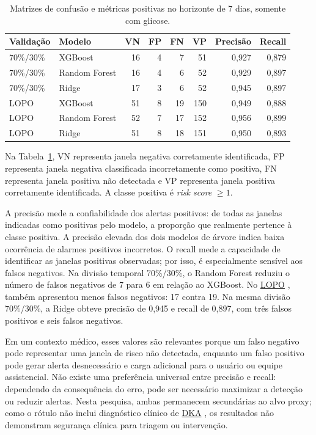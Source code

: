 \documentclass[12pt,a4paper]{article}
\DeclareRobustCommand{\sigla}[1]{%
    \texorpdfstring{\hyperlink{sigla:#1}{#1}}{#1}%
}
\begin{document}
\begin{table}[H]
    \centering
    \caption{Matrizes de confusão e métricas positivas no horizonte de 7 dias,
    somente com glicose.}
    \label{tab:matrizes-confusao}
    \small
    \begin{tabular}{llrrrrrr}
        \toprule
        Validação & Modelo & VN & FP & FN & VP & Precisão & Recall \\
        \midrule
        70\%/30\% & XGBoost & 16 & 4 & 7 & 51 & 0,927 & 0,879 \\
        70\%/30\% & Random Forest & 16 & 4 & 6 & 52 & 0,929 & 0,897 \\
        70\%/30\% & Ridge & 17 & 3 & 6 & 52 & 0,945 & 0,897 \\
        LOPO & XGBoost & 51 & 8 & 19 & 150 & 0,949 & 0,888 \\
        LOPO & Random Forest & 52 & 7 & 17 & 152 & 0,956 & 0,899 \\
        LOPO & Ridge & 51 & 8 & 18 & 151 & 0,950 & 0,893 \\
        \bottomrule
    \end{tabular}
\end{table}

Na Tabela~\ref{tab:matrizes-confusao}, VN representa janela negativa corretamente
identificada, FP representa janela negativa classificada incorretamente como
positiva, FN representa janela positiva não detectada e VP representa janela
positiva corretamente identificada. A classe positiva é \textit{risk score}
$\geq 1$.

A precisão mede a confiabilidade dos alertas positivos: de todas as janelas
indicadas como positivas pelo modelo, a proporção que realmente pertence à
classe positiva. A precisão elevada dos dois modelos de árvore indica baixa ocorrência
de alarmes positivos incorretos. O recall mede a capacidade de identificar
as janelas positivas observadas; por isso, é especialmente sensível aos
falsos negativos. Na divisão temporal 70\%/30\%, o Random Forest reduziu o
número de falsos negativos de 7 para 6 em relação ao XGBoost. No \sigla{LOPO},
também apresentou menos falsos negativos: 17 contra 19.
Na mesma divisão 70\%/30\%, a Ridge obteve precisão de 0,945 e recall de
0,897, com três falsos positivos e seis falsos negativos.

Em um contexto médico, esses valores são relevantes porque um falso negativo
pode representar uma janela de risco não detectada, enquanto um falso positivo
pode gerar alerta desnecessário e carga adicional para o usuário ou equipe
assistencial. Não existe uma preferência universal entre precisão e recall:
dependendo da consequência do erro, pode ser necessário maximizar a detecção
ou reduzir alertas. Nesta pesquisa, ambas permanecem secundárias ao alvo
proxy; como o rótulo não inclui diagnóstico clínico de \sigla{DKA}, os
resultados não demonstram segurança clínica para triagem ou intervenção.
\end{document}
